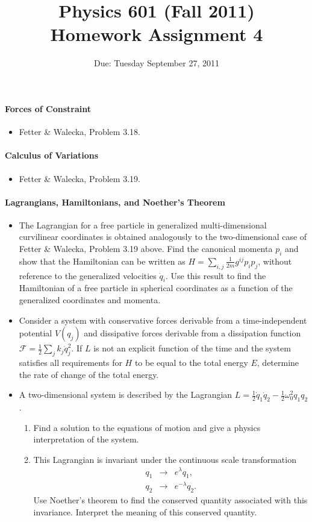 \documentclass[letterpaper,11pt]{article}
\title{Physics 601 (Fall 2011) \\ Homework Assignment 4}
\date{Due: Tuesday September 27, 2011}
\begin{document}
\maketitle

\paragraph*{Forces of Constraint}
\begin{itemize}
 \item Fetter \& Walecka, Problem 3.18.
\end{itemize}

\paragraph*{Calculus of Variations}
\begin{itemize}
 \item Fetter \& Walecka, Problem 3.19.
\end{itemize}

\paragraph*{Lagrangians, Hamiltonians, and Noether's Theorem}
\begin{itemize}
 \item The Lagrangian for a free particle in generalized multi-dimensional curvilinear coordinates is obtained analogously to the two-dimensional case of Fetter \& Walecka, Problem 3.19 above.  Find the canonical momenta $p_i$ and show that the Hamiltonian can be written as $H = \sum_{i,j} \frac{1}{2m} g^{ij} p_i p_j$, without reference to the generalized velocities $\dot{q}_i$.  Use this result to find the Hamiltonian of a free particle in spherical coordinates as a function of the generalized coordinates and momenta.
 \item Consider a system with conservative forces derivable from a time-independent potential $V(q_j)$ and dissipative forces derivable from a dissipation function $\mathcal{F} = \frac{1}{2}\sum_j k_j \dot{q}_j^2$.  If $L$ is not an explicit function of the time and the system satisfies all requirements for $H$ to be equal to the total energy $E$, determine the rate of change of the total energy.
 \item A two-dimensional system is described by the Lagrangian $L = \frac{1}{2} \dot{q}_1 \dot{q}_2 - \frac{1}{2}\omega_0^2 q_1 q_2$.
 \begin{enumerate}
  \item Find a solution to the equations of motion and give a physics interpretation of the system.
  \item This Lagrangian is invariant under the continuous scale transformation
  \begin{eqnarray*}
   q_1 & \to & e^{\lambda} q_1, \\
   q_2 & \to & e^{-\lambda} q_2.
  \end{eqnarray*}
  Use Noether's theorem to find the conserved quantity associated with this invariance.  Interpret the meaning of this conserved quantity.
 \end{enumerate}

\end{itemize}
\end{document}
